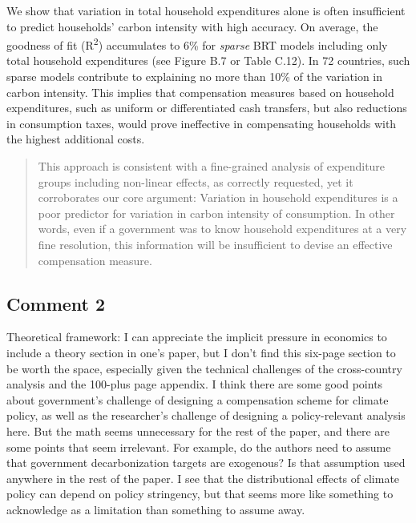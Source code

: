 \documentclass[11pt]{article}
\newenvironment{response}
{\begin{quote}\color{black}}
{\end{quote}}
\begin{document}
\begin{revisionbox}
    We show that variation in total household expenditures alone is often insufficient to predict households' carbon intensity with high accuracy. On average, the goodness of fit (R\textsuperscript{2}) accumulates to 6\% for \textit{sparse} BRT models including only total household expenditures (see Figure B.7 or Table C.12). In 72 countries, such sparse models contribute to explaining no more than 10\% of the variation in carbon intensity. This implies that compensation measures based on household expenditures, such as uniform or differentiated cash transfers, but also reductions in consumption taxes, would prove ineffective in compensating households with the highest additional costs.
\end{revisionbox}

\begin{response}
This approach is consistent with a fine-grained analysis of expenditure groups including non-linear effects, as correctly requested, yet it corroborates our core argument: Variation in household expenditures is a poor predictor for variation in carbon intensity of consumption. In other words, even if a government was to know household expenditures at a very fine resolution, this information will be insufficient to devise an effective compensation measure.
\end{response}

\subsection*{Comment 2}\label{comment_R1_2}

\begin{commentbox}
    Theoretical framework: I can appreciate the implicit pressure in economics to include a theory section in one's paper, but I don't find this six-page section to be worth the space, especially given the technical challenges of the cross-country analysis and the 100-plus page appendix. I think there are some good points about government's challenge of designing a compensation scheme for climate policy, as well as the researcher's challenge of designing a policy-relevant analysis here. But the math seems unnecessary for the rest of the paper, and there are some points that seem irrelevant. For example, do the authors need to assume that government decarbonization targets are exogenous? Is that assumption used anywhere in the rest of the paper. I see that the distributional effects of climate policy can depend on policy stringency, but that seems more like something to acknowledge as a limitation than something to assume away.
\end{commentbox}
\end{document}
